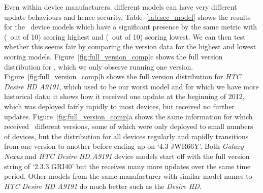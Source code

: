 Even within device manufacturers, different models can have very different update behaviours and hence security.
Table~\ref{tab:sec_model} shows the results for the \daNumSigModels\ device models which have a significant presence by the same metric with \emph{\daSecScoreBestmodel} (\daSecScoreBestmodelScore\ out of 10) scoring highest and \emph{\daSecScoreWorstmodel} (\daSecScoreWorstmodelScore\ out of 10) scoring lowest.
We can then test whether this seems fair by comparing the version data for the highest and lowest scoring models.
Figure~\ref{fig:full_version_comp}c shows the full version distribution for \emph{\daSecScoreWorstmodel}, which we only observe running one version.
Figure~\ref{fig:full_version_comp}b shows the full version distribution for \emph{HTC Desire HD A9191}, which used to be our worst model and for which we have more historical data; it shows how it received one update at the beginning of 2012, which was deployed fairly rapidly to most devices, but received no further updates.
Figure~\ref{fig:full_version_comp}a shows the same information for \emph{\daSecScoreBestmodel} which received \daSecScoreBestmodelNumFullVersions\ different versions, some of which were only deployed to small numbers of devices, but the distribution for all devices regularly and rapidly transitions from one version to another before ending up on `4.3 JWR66Y'.
Both \emph{Galaxy Nexus} and \emph{HTC Desire HD A9191} device models start off with the full version string of `2.3.3 GRI40' but the \emph{\daSecScoreBestmodel} receives many more updates over the same time period.
Other models from the same manufacturer with similar model names to \emph{HTC Desire HD A9191} do much better such as the \emph{Desire HD}.

